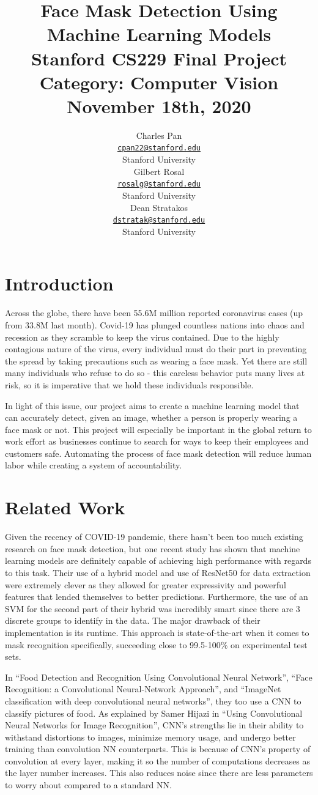 \documentclass{article}
\title{
  Face Mask Detection Using Machine Learning Models\\
  \vspace{1em}
  \small{\normalfont Stanford CS229 Final Project}\\
  \small{\normalfont Category: Computer Vision}\\
  \small{\normalfont November 18th, 2020}
}
\author{
  Charles Pan \\
  \href{mailto:cpan22@stanford.edu}{\texttt{cpan22@stanford.edu}} \\
  Stanford University \\
  \And
  Gilbert Rosal \\
  \href{mailto:rosalg@stanford.edu}{\texttt{rosalg@stanford.edu}} \\
  Stanford University \\
  \And
  Dean Stratakos \\
  \href{mailto:dstratak@stanford.edu}{\texttt{dstratak@stanford.edu}} \\
  Stanford University \\
}
\begin{document}
\maketitle

\section{Introduction}
Across the globe, there have been 55.6M million reported coronavirus cases (up from 33.8M last month). Covid-19 has plunged countless nations into chaos and recession as they scramble to keep the virus contained. Due to the highly contagious nature of the virus, every individual must do their part in preventing the spread by taking precautions such as wearing a face mask. Yet there are still many individuals who refuse to do so - this careless behavior puts many lives at risk, so it is imperative that we hold these individuals responsible.

In light of this issue, our project aims to create a machine learning model that can accurately detect, given an image, whether a person is properly wearing a face mask or not. This project will especially be important in the global return to work effort as businesses continue to search for ways to keep their employees and customers safe. Automating the process of face mask detection will reduce human labor while creating a system of accountability.

\section{Related Work}
Given the recency of COVID-19 pandemic, there hasn’t been too much existing research on face mask detection, but one recent study \cite{LOEY2021108288} has shown that machine learning models are definitely capable of achieving high performance with regards to this task. Their use of a hybrid model and use of ResNet50 for data extraction were extremely clever as they allowed for greater expressivity and powerful features that lended themselves to better predictions. Furthermore, the use of an SVM for the second part of their hybrid was incredibly smart since there are 3 discrete groups to identify in the data. The major drawback of their implementation is its runtime. This approach is state-of-the-art when it comes to mask recognition specifically, succeeding close to 99.5-100\% on experimental test sets.

In “Food Detection and Recognition Using Convolutional Neural Network”\cite{10.1145/2647868.2654970}, “Face Recognition: a Convolutional Neural-Network Approach”\cite{554195}, and “ImageNet classification with deep convolutional neural networks”\cite{10.1145/3065386}, they too use a CNN to classify pictures of food. As explained by Samer Hijazi in “Using Convolutional Neural Networks for Image Recognition”\cite{Hijazi2015UsingCN}, CNN’s strengths lie in their ability to withstand distortions to images, minimize memory usage, and undergo better training than convolution NN counterparts. This is because of CNN’s property of convolution at every layer, making it so the number of computations decreases as the layer number increases. This also reduces noise since there are less parameters to worry about compared to a standard NN.
\end{document}

